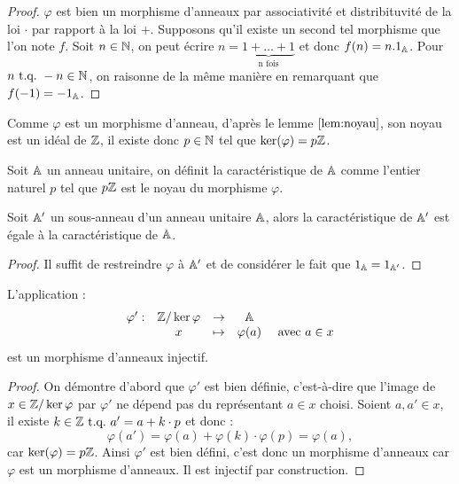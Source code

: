 \begin{proof}
$\varphi$ est bien un morphisme d'anneaux par associativité et distribituvité de la loi $\cdot$ par rapport à la loi $+$. \newline
Supposons qu'il existe un second tel morphisme que l'on note $f$. 
Soit $n \in \mathbb{N}$, on peut écrire $n = \underbrace{1 + \dots + 1}_{\text{n fois}}$ et donc $f(n) = n.1_{\mathbb{A}}$. 
Pour $n \text{~t.q.~} -n \in \mathbb{N}$, on raisonne de la même manière en remarquant que $f(-1) = -1_{\mathbb{A}}$.
\end{proof}

\begin{rmq}
Comme $\varphi$ est un morphisme d'anneau, d'après le lemme $\ref{lem:noyau}$, son noyau est un idéal de $\mathbb{Z}$,
il existe donc $p \in \mathbb{N}$ tel que $\ker(\varphi)=p\mathbb{Z}$.
\end{rmq}

\begin{defn}
Soit $\mathbb{A}$ un anneau unitaire, on définit la caractéristique de $\mathbb{A}$ comme l'entier naturel $p$ 
tel que $p\mathbb{Z}$ est le noyau du morphisme $\varphi$.
\end{defn}

\begin{lem}
\label{lem:caracSS}
Soit $\mathbb{A}'$ un sous-anneau d'un anneau unitaire $\mathbb{A}$, alors la caractéristique de $\mathbb{A}'$ est égale à la caractéristique de $\mathbb{A}$.
\end{lem}

\begin{proof}
Il suffit de restreindre $\varphi$ à $\mathbb{A}'$ et de considérer le fait que $1_{\mathbb{A}} = 1_{\mathbb{A}'}$.
\end{proof}

\begin{lem}
\label{lem:isoKer}
L'application :
\[ \begin{array}{c c c c c}
\varphi' : & \mathbb{Z}/\ker{\varphi} & \to & \mathbb{A} & \\
& x & \mapsto & \varphi(a) & \text{~avec~} a \in x
\end{array} \]
est un morphisme d'anneaux injectif.
\end{lem}

\begin{proof}
On démontre d'abord que $\varphi'$ est bien définie, c'est-à-dire que l'image de $x \in \mathbb{Z}/\ker{\varphi}$ par $\varphi'$ 
ne dépend pas du représentant $a \in x$ choisi.
Soient $a, a' \in x$, il existe $k \in \mathbb{Z} \text{~t.q.~} a'=a+k \cdot p$ et donc :
\[ \varphi(a') = \varphi(a) + \varphi(k) \cdot \varphi(p) = \varphi(a) , \]
car $\ker(\varphi) = p\mathbb{Z}$.
Ainsi $\varphi'$ est bien défini, c'est donc un morphisme d'anneaux car $\varphi$ est un morphisme d'anneaux.
Il est injectif par construction.
\end{proof}

